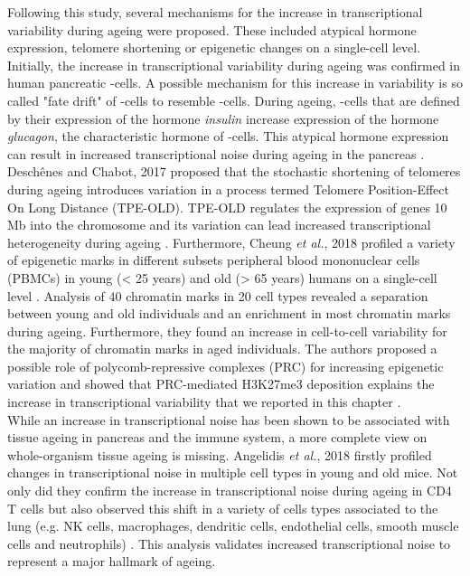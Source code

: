 Following this study, several mechanisms for the increase in transcriptional variability during ageing were proposed. These included atypical hormone expression, telomere shortening or epigenetic changes on a single-cell level. \\
Initially, the increase in transcriptional variability during ageing was confirmed in human pancreatic \textbeta{}-cells. A possible mechanism for this increase in variability is so called "fate drift" of \textbeta{}-cells to resemble \textalpha{}-cells. During ageing, \textbeta{}-cells that are defined by their expression of the hormone \emph{insulin} increase expression of the hormone \emph{glucagon}, the characteristic hormone of \textalpha{}-cells. This atypical hormone expression can result in increased transcriptional noise during ageing in the pancreas \citep{Enge2017}. Desch\^{e}nes and Chabot, 2017 proposed that the stochastic shortening of telomeres during ageing introduces variation in a process termed Telomere Position-Effect On Long Distance (TPE-OLD). 	TPE-OLD regulates the expression of genes 10 Mb into the chromosome and its variation can lead increased transcriptional heterogeneity during ageing \cite{Deschenes2017}. Furthermore, Cheung \emph{et al.}, 2018 profiled a variety of epigenetic marks in different subsets peripheral blood mononuclear cells (PBMCs) in young (< 25 years) and old (> 65 years) humans on a single-cell level \citep{Cheung2018}. Analysis of 40 chromatin marks in 20 cell types revealed a separation between young and old individuals and an enrichment in most chromatin marks during ageing. Furthermore, they found an increase in cell-to-cell variability for the majority of chromatin marks in aged individuals. The authors proposed a possible role of polycomb-repressive complexes (PRC) for increasing epigenetic variation and showed that PRC-mediated H3K27me3 deposition explains the increase in transcriptional variability that we reported in this chapter \citep{Cheung2018}.\\

While an increase in transcriptional noise has been shown to be associated with tissue ageing in pancreas and the immune system, a more complete view on whole-organism tissue ageing is missing. Angelidis \emph{et al.}, 2018 firstly profiled changes in transcriptional noise in multiple cell types in young and old mice. Not only did they confirm the increase in transcriptional noise during ageing in CD4\plus{} T cells but also observed this shift in a variety of cells types associated to the lung (e.g. NK cells, macrophages, dendritic cells, endothelial cells, smooth muscle cells and neutrophils) \citep{Angelidis2018}. This analysis validates increased transcriptional noise to represent a major hallmark of ageing. \\

